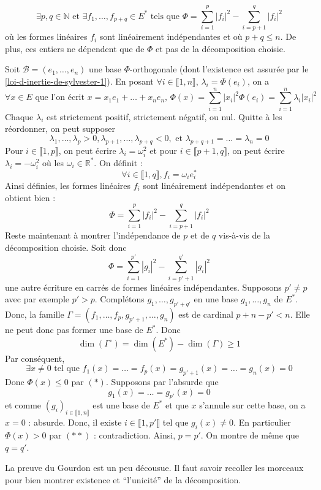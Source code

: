 	\begin{theorem}
		\[ \exists p, q \in \mathbb{N} \text{ et } \exists f_1, \dots, f_{p+q} \in E^* \text{ tels que } \Phi = \sum_{i=1}^p |f_i|^2 - \sum_{i=p+1}^q |f_i|^2 \]
		où les formes linéaires $f_i$ sont linéairement indépendantes et où $p + q \leq n$. De plus, ces entiers ne dépendent que de $\Phi$ et pas de la décomposition choisie.
	\end{theorem}

	\begin{demonstration}
		Soit $\mathcal{B} = (e_1, \dots, e_n)$ une base $\Phi$-orthogonale (dont l'existence est assurée par le \cref{loi-d-inertie-de-sylvester-1}). En posant $\forall i \in \llbracket 1, n \rrbracket$, $\lambda_i = \Phi(e_i)$, on a
		\[ \forall x \in E \text{ que l'on écrit } x = x_1 e_1 + \dots + x_n e_n, \, \Phi(x) = \sum_{i=1}^n |x_i|^2 \Phi(e_i) = \sum_{i=1}^n \lambda_i |x_i|^2 \]
		Chaque $\lambda_i$ est strictement positif, strictement négatif, ou nul. Quitte à les réordonner, on peut supposer
		\[ \lambda_1, \dots, \lambda_p > 0, \lambda_{p+1}, \dots, \lambda_{p+q} < 0, \text{ et } \lambda_{p+q+1} = \dots = \lambda_n = 0 \]
		Pour $i \in \llbracket 1, p \rrbracket$, on peut écrire $\lambda_i = \omega_i^2$ et pour $i \in \llbracket p+1, q \rrbracket$, on peut écrire $\lambda_i = -\omega_i^2$ où les $\omega_i \in \mathbb{R}^*$. On définit :
		\[ \forall i \in \llbracket 1, q \rrbracket, f_i = \omega_i e_i^* \]
		Ainsi définies, les formes linéaires $f_i$ sont linéairement indépendantes et on obtient bien :
		\[ \Phi = \sum_{i=1}^p |f_i|^2 - \sum_{i=p+1}^q |f_i|^2 \tag{$*$} \]
		Reste maintenant à montrer l'indépendance de $p$ et de $q$ vis-à-vis de la décomposition choisie. Soit donc
		\[ \Phi = \sum_{i=1}^{p'} |g_i|^2 - \sum_{i=p'+1}^{q'} |g_i|^2 \tag{$**$} \]
		une autre écriture en carrés de formes linéaires indépendantes. Supposons $p' \neq p$ avec par exemple $p' > p$. Complétons $g_1, \dots, g_{p'+q'}$ en une base $g_1, \dots, g_n$ de $E^*$. Donc, la famille $\Gamma = (f_1, \dots, f_p, g_{p'+1}, \dots, g_n)$ est de cardinal $p + n - p' < n$. Elle ne peut donc pas former une base de $E^*$. Donc
		\[ \dim(\Gamma^\circ) = \dim(E^*) - \dim(\Gamma) \geq 1 \]
		Par conséquent,
		\[ \exists x \neq 0 \text{ tel que } f_1(x) = \dots = f_p(x) = g_{p'+1}(x) = \dots = g_n(x) = 0 \]
		Donc $\Phi(x) \leq 0$ par $(*)$. Supposons par l'absurde que
		\[ g_1(x) = \dots = g_{p'}(x) = 0 \]
		et comme $(g_i)_{i \in \llbracket 1, n \rrbracket}$ est une base de $E^*$ et que $x$ s'annule sur cette base, on a $x = 0$ : absurde. Donc, il existe $i \in \llbracket 1, p' \rrbracket$ tel que $g_i(x) \neq 0$. En particulier $\Phi(x) > 0$ par $(**)$ : contradiction. Ainsi, $p = p'$. On montre de même que $q = q'$.
	\end{demonstration}

	\begin{remark}
		La preuve du Gourdon est un peu décousue. Il faut savoir recoller les morceaux pour bien montrer existence et ``l'unicité'' de la décomposition.
	\end{remark}

